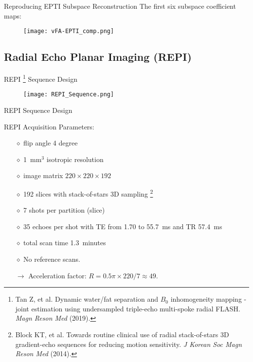 \begin{frame}{Reproducing EPTI Subspace Reconstruction}
The first six subspace coefficient maps:
\begin{figure}
	\texttt{[image: vFA-EPTI\_comp.png]}
\end{figure}
\end{frame}

\subsection{Radial Echo Planar Imaging (REPI)}

\begin{frame}{REPI \footnote{Tan Z, et al. Dynamic water/fat separation and $B_0$ inhomogeneity mapping - joint estimation using undersampled triple-echo multi-spoke radial FLASH. \textit{Magn Reson Med} (2019).} Sequence Design}
	\begin{figure}
		\texttt{[image: REPI\_Sequence.png]}
	\end{figure}
\end{frame}

\begin{frame}{REPI Sequence Design}

\begin{block}{REPI Acquisition Parameters:}
{\large
	\begin{itemize}
		\item [$\diamond$] flip angle 4 degree
		\item [$\diamond$] 1~mm$^3$ isotropic resolution
		\item [$\diamond$] image matrix $220 \times 220 \times 192$
		\item [$\diamond$] 192 slices with stack-of-stars 3D sampling 
		\footnote{Block KT, et al. Towards routine clinical use of radial stack-of-stars 3D gradient-echo sequences for reducing motion sensitivity. \textit{J Korean Soc Magn Reson Med} (2014).}
		\item [$\diamond$] 7 shots per partition (slice)
		\item [$\diamond$] 35 echoes per shot with TE from 1.70 to 55.7~ms and TR 57.4~ms
		\item [$\diamond$] total scan time 1.3~minutes
		\item [$\diamond$] No reference scans.
		\vspace{1em}
		\item [$\rightarrow$] Acceleration factor: $R = 0.5\pi \times 220 /7 \approx 49$.
	\end{itemize}
}
\end{block}

\end{frame}

